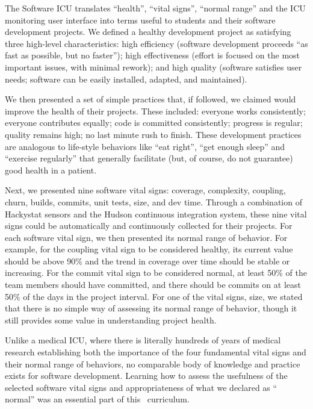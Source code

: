 The Software ICU translates ``health'', ``vital signs'', ``normal range''
and the ICU monitoring user interface into terms useful to students and
their software development projects.  We defined a healthy development
project as satisfying three high-level characteristics: high efficiency
(software development proceeds ``as fast as possible, but no faster'');
high effectiveness (effort is focused on the most important issues, with
minimal rework); and high quality (software satisfies user needs; software
can be easily installed, adapted, and maintained).

We then presented a set of simple practices that, if followed, we claimed
would improve the health of their projects.  These included: everyone works
consistently; everyone contributes equally; code is committed consistently;
progress is regular; quality remains high; no last minute rush to finish.
These development practices are analogous to life-style behaviors like
``eat right'', ``get enough sleep'' and ``exercise regularly'' that
generally facilitate (but, of course, do not guarantee) good health in a
patient.

Next, we presented nine software vital signs: coverage, complexity,
coupling, churn, builds, commits, unit tests, size, and dev time. Through a
combination of Hackystat sensors and the Hudson continuous integration
system, these nine vital signs could be automatically and continuously
collected for their projects.  For each software vital sign, we then
presented its normal range of behavior.  For example, for the coupling
vital sign to be considered healthy, its current value should be above 90\%
and the trend in coverage over time should be stable or increasing.  For
the commit vital sign to be considered normal, at least 50\% of the team
members should have committed, and there should be commits on at least 50\%
of the days in the project interval.  For one of the vital signs, size, we
stated that there is no simple way of assessing its normal range of
behavior, though it still provides some value in understanding project
health.

Unlike a medical ICU, where there is literally hundreds of years of medical
research establishing both the importance of the four fundamental vital
signs and their normal range of behaviors, no comparable body of knowledge
and practice exists for software development.  Learning how to assess the
usefulness of the selected software vital signs and appropriateness of what
we declared as `` normal'' was an essential part of this \eCT\ curriculum.


